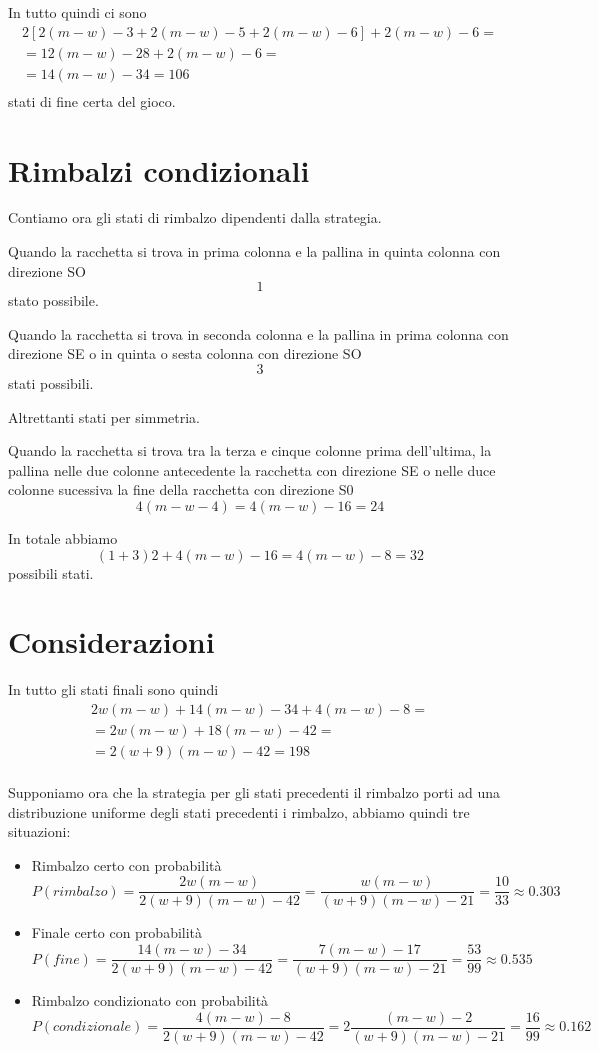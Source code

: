 \documentclass[a4paper,11pt]{article}
\begin{document}
In tutto quindi ci sono
\[
\begin{array}{r}
 2[2(m-w)-3+2(m-w)-5+2(m-w)-6]+2(m-w)-6 = \\
 = 12(m-w)-28+2(m-w)-6 = \\
 = 14(m-w)-34 = 106 \\
\end{array}
\] stati di fine certa del gioco.

\section{Rimbalzi condizionali}

Contiamo ora gli stati di rimbalzo dipendenti dalla strategia.

Quando la racchetta si trova in prima colonna e la pallina in quinta colonna con direzione SO 
\[
1
\]
stato possibile.

Quando la racchetta si trova in seconda colonna e la pallina in prima colonna con direzione SE o in quinta o sesta colonna con direzione SO
\[
3
\]
stati possibili.

Altrettanti stati per simmetria.

Quando la racchetta si trova tra la terza e cinque colonne prima dell'ultima, la pallina nelle due colonne antecedente la racchetta
con direzione SE o nelle duce colonne sucessiva la fine della racchetta
con direzione S0
\[
4 (m-w-4)=4(m-w)-16=24
\]

In totale abbiamo
\[
(1+3)2+4(m-w)-16=4(m-w)-8=32
\]
possibili stati.

\section{Considerazioni}

In tutto gli stati finali sono quindi 
\[
\begin{array}{r}
 2w(m-w)+14(m-w)-34+4(m-w)-8= \\
 =2w(m-w)+18(m-w)-42= \\
 =2(w+9)(m-w)-42= 198\\
\end{array}
\]

Supponiamo ora che la strategia per gli stati precedenti il rimbalzo
porti ad una distribuzione uniforme degli stati precedenti i rimbalzo, abbiamo quindi tre situazioni:

\begin{itemize}
	\item 	
	Rimbalzo certo con probabilità
	 \[ P(rimbalzo)=\frac{2w(m-w)}{2(w+9)(m-w)-42}
	 =\frac{w(m-w)}{(w+9)(m-w)-21}
	 = \frac{10}{33}\approx0.303
	 \]

	\item 	
	Finale certo con probabilità 
	 \[ P(fine)=\frac{14(m-w)-34}{2(w+9)(m-w)-42}
	 =\frac{7(m-w)-17}{(w+9)(m-w)-21}
	 = \frac{53}{99}\approx0.535
	 \]
	 
	 \item 	
	 Rimbalzo condizionato con probabilità 
	 \[ P(condizionale)=\frac{4(m-w)-8}{2(w+9)(m-w)-42}
	 =2\frac{(m-w)-2}{(w+9)(m-w)-21}
	 = \frac{16}{99}\approx0.162
	 \]
\end{itemize}
\end{document}

